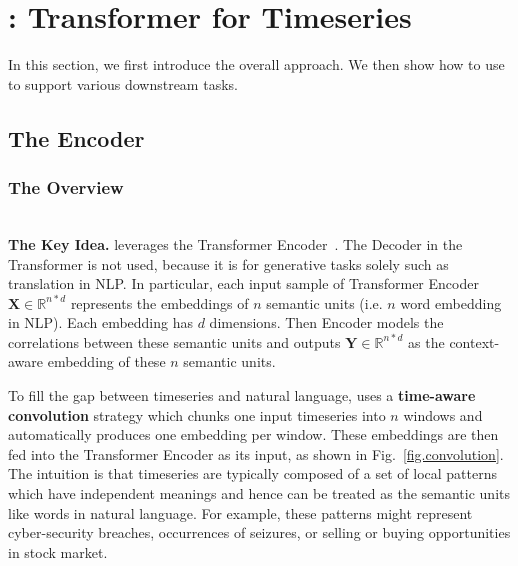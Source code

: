 \section{\system: Transformer for Timeseries}
\label{sec.rita}
In this section, we first introduce the overall \system approach. We then show how to use \system to support various downstream tasks. 

\begin{sloppypar}

\subsection{The \system Encoder}
\label{sec.rita.encoder}

\subsubsection{The Overview\nopunct}\ \\
\noindent\textbf{The Key Idea.} \system leverages the Transformer Encoder~\cite{DBLP:conf/nips/VaswaniSPUJGKP17}. The Decoder in the Transformer is not used, because it is for generative tasks solely such as translation in NLP. In particular, each input sample of Transformer Encoder $\mathbf{X} \in \mathbb{R}^{n*d}$ represents the embeddings of $n$ semantic units (i.e. $n$ word embedding in NLP). Each embedding has $d$ dimensions. Then Encoder models the correlations between these semantic units and outputs $\mathbf{Y} \in \mathbb{R}^{n*d}$ as the context-aware embedding of these $n$ semantic units.

To fill the gap between timeseries and natural language, \system uses a {\bf time-aware convolution} strategy which chunks one input timeseries into $n$ windows and automatically produces one embedding per window. These embeddings are then fed into the Transformer Encoder as its input, as shown in Fig.~\ref{fig.convolution}.
The intuition is that timeseries are typically composed of a set of local patterns which have independent meanings and hence can be treated as the semantic units like words in natural language. For example, these patterns might represent cyber-security breaches, occurrences of seizures, or selling or buying opportunities in stock market.  


\end{sloppypar}
